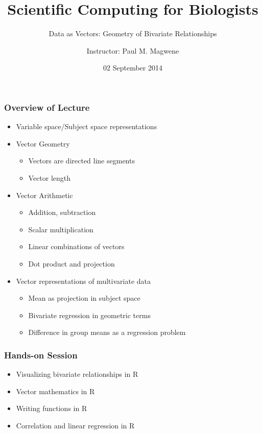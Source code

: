 \documentclass{beamer}
\title{Scientific Computing for Biologists}
\subtitle{Data as Vectors: Geometry of Bivariate Relationships} %
\author[P. Magwene]{Instructor: Paul M. Magwene}
\date{02 September 2014}
\begin{document}
\begin{frame}
\titlepage
\end{frame}

\begin{frame}
  \frametitle{Overview of Lecture}

\begin{itemize}
        \item Variable space/Subject space representations
		\item Vector Geometry
		\begin{itemize}
			\item Vectors are directed line segments
			\item Vector length
		\end{itemize}
		\item Vector Arithmetic
		\begin{itemize}
			\item Addition, subtraction
			\item Scalar multiplication
			\item Linear combinations of vectors
			\item Dot product and projection
		\end{itemize}
		\item Vector representations of multivariate data
        \begin{itemize}
			\item Mean as projection in subject space
			\item Bivariate regression in geometric terms
			\item Difference in group means as a regression problem
		\end{itemize}
\end{itemize}

\end{frame}

\begin{frame}
  \frametitle{Hands-on Session}
		\begin{itemize}
          \item Visualizing bivariate relationships in R
		  \item Vector mathematics in R
		  \item Writing functions in R
		  \item Correlation and linear regression in R
	 \end{itemize}
\end{frame}
\end{document}
